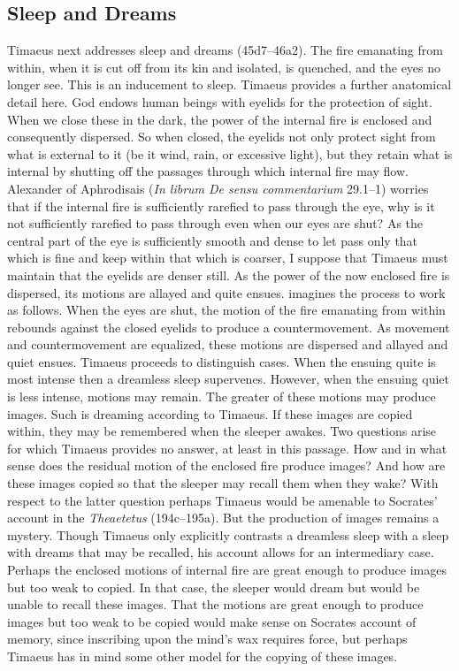 \subsection{Sleep and Dreams} %
\label{sub:sleep_and_dreams}

Timaeus next addresses sleep and dreams (45d7--46a2). The fire emanating from within, when it is cut off from its kin and isolated, is quenched, and the eyes no longer see. This is an inducement to sleep. Timaeus provides a further anatomical detail here. God endows human beings with eyelids for the protection of sight. When we close these in the dark, the power of the internal fire is enclosed and consequently dispersed. So when closed, the eyelids not only protect sight from what is external to it (be it wind, rain, or excessive light), but they retain what is internal by shutting off the passages through which internal fire may flow. Alexander of Aphrodisais (\emph{In librum De sensu commentarium} 29.1--1) worries that if the internal fire is sufficiently rarefied to pass through the eye, why is it not sufficiently rarefied to pass through even when our eyes are shut? As the central part of the eye is sufficiently smooth and dense to let pass only that which is fine and keep within that which is coarser, I suppose that Timaeus must maintain that the eyelids are denser still. As the power of the now enclosed fire is dispersed, its motions are allayed and quite ensues. \citet[282--3]{Taylor:1928qb} imagines the process to work as follows. When the eyes are shut, the motion of the fire emanating from within rebounds against the closed eyelids to produce a countermovement. As movement and countermovement are equalized, these motions are dispersed and allayed and quiet ensues. Timaeus proceeds to distinguish cases. When the ensuing quite is most intense then a dreamless sleep supervenes. However, when the ensuing quiet is less intense, motions may remain. The greater of these motions may produce images. Such is dreaming according to Timaeus. If these images are copied within, they may be remembered when the sleeper awakes. Two questions arise for which Timaeus provides no answer, at least in this passage. How and in what sense does the residual motion of the enclosed fire produce images? And how are these images copied so that the sleeper may recall them when they wake? With respect to the latter question perhaps Timaeus would be amenable to Socrates' account in the \emph{Theaetetus} (194c--195a). But the production of images remains a mystery. Though Timaeus only explicitly contrasts a dreamless sleep with a sleep with dreams that may be recalled, his account allows for an intermediary case. Perhaps the enclosed motions of internal fire are great enough to produce images but too weak to copied. In that case, the sleeper would dream but would be unable to recall these images. That the motions are great enough to produce images but too weak to be copied would make sense on Socrates account of memory, since inscribing upon the mind's wax requires force, but perhaps Timaeus has in mind some other model for the copying of these images. 

